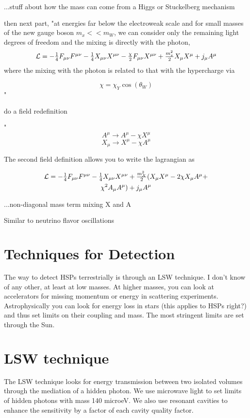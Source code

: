 \documentclass[12pt, twoside]{book}
\begin{document}
...stuff about how the mass can come from a Higgs or Stuckelberg mechanism

then next part, "at energies far below the electroweak scale and for small masses of the new gauge boson $m_x << m_W$, we can consider only the remaining light degrees of freedom and the mixing is directly with the photon,
\begin{multline}
$$\mathcal{L} = -\frac{1}{4}F_{\mu\nu}F^{\mu\nu} - \frac{1}{4}X_{\mu\nu}X^{\mu\nu} - \frac{\chi}{2}F_{\mu\nu}X^{\mu\nu}+\frac{m_x^2}{2}X_{\mu}X^{\mu}+j_{\mu}A^{\mu}$$ 
\end{multline}
where the mixing with the photon is related to that with the hypercharge via

$$\chi = \chi_Y \cos(\theta_W)$$"

do a field redefinition

"$$A^{\mu} \rightarrow A^{\mu} - \chi X^{\mu}$$
$$X_{\mu} \rightarrow X^{\mu}-\chi A^{\mu}$$

The second field definition allows you to write the lagrangian as

\begin{multline}
$$\mathcal{L} = -\frac{1}{4}F_{\mu\nu}F^{\mu\nu}-\frac{1}{4}X_{\mu\nu}X^{\mu\nu} +\frac{m_X^2}{2}(X_{\mu}X^{\mu}-2\chi X_{\mu}A^{\mu}+\\ \chi^2 A_{\mu}A^{\mu}) + j_{\mu}A^{\mu}$$
\end{multline}

...non-diagonal mass term mixing X and A

Similar to neutrino flavor oscillations

\section{Techniques for Detection}

The way to detect HSPs terrestrially is through an LSW technique. I don’t know of any other, at least at low masses. At higher masses, you can look at accelerators for missing momentum or energy in scattering experiments. Astrophysically you can look for energy loss in stars (this applies to HSPs right?) and thus set limits on their coupling and mass. The most stringent limits are set through the Sun.

\section{LSW technique}

The LSW technique looks for energy transmission between two isolated volumes through the mediation of a hidden photon. We use microwave light to set limits of hidden photons with mass 140 microeV. We also use resonant cavities to enhance the sensitivity by a factor of each cavity quality factor.
\end{document}
